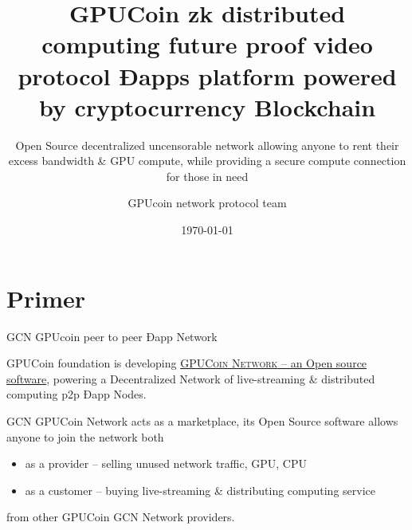 \documentclass[10pt,handout]{beamer}
\title{GPUCoin zk distributed computing future proof video protocol Ðapps platform powered by cryptocurrency Blockchain}
\subtitle{Open Source decentralized uncensorable network allowing anyone to rent their excess bandwidth \& GPU compute, while providing a secure compute connection for those in need}
\date{\today}
\author{GPUcoin network protocol team}
\institute{ GPUcoin Foundation}
\newcommand{\themename}{\textbf{\textsc{metropolis}}\xspace}
\begin{document}
\maketitle


\section{Primer}


\begin{frame}[fragile]{GCN GPUcoin peer to peer Ðapp Network }

 GPUCoin foundation is developing \href{https://onhoot.com/tokensale}{\textsc{GPUCoin Network} – an Open source software}, powering a Decentralized Network of live-streaming \& distributed computing p2p Ðapp Nodes.
 

GCN GPUCoin Network acts as a marketplace, its Open Source software allows anyone to join the network both 

\begin{itemize}
\item as a provider – selling unused network traffic, GPU, CPU
\item as a customer – buying live-streaming \& distributing computing service
\end{itemize}
 from other GPUCoin GCN Network providers. 
\end{frame}
\end{document}
